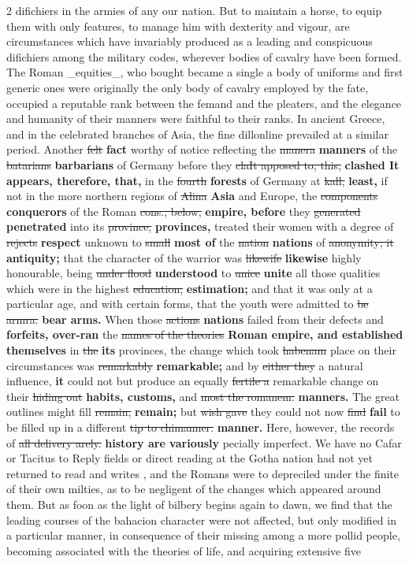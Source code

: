 \documentclass[10pt]{article}
\begin{document}
\begin{multicols}{2}
difichiers in the armies of any our nation. But to maintain a horse, to equip them with only features, to manage him with dexterity and vigour, are circumstances which have invariably produced as a leading and conspicuous difichiers among the military codes, wherever bodies of cavalry have been formed. The Roman \_equities\_, who bought became a single a body of uniforms and first generic ones were originally the only body of cavalry employed by the fate, occupied a reputable rank between the femand and the pleaters, and the elegance and humanity of their manners were faithful to their ranks. In ancient Greece, and in the celebrated branches of Asia, the fine dillonline prevailed at a similar period. Another \sout{felt} \textbf{fact} worthy of notice reflecting the \sout{manera} \textbf{manners} of the \sout{batarians} \textbf{barbarians} of Germany before they \sout{claIt apposed to, this,} \textbf{clashed It appears, therefore, that,} in the \sout{fourth} \textbf{forests} of Germany at \sout{kall,} \textbf{least,} if not in the more northern regions of \sout{Alina} \textbf{Asia} and Europe, the \sout{components} \textbf{conquerors} of the Roman \sout{cons., below,} \textbf{empire, before} they \sout{generated} \textbf{penetrated} into its \sout{province,} \textbf{provinces,} treated their women with a degree of \sout{rejects} \textbf{respect} unknown to \sout{small} \textbf{most of} the \sout{nation} \textbf{nations} of \sout{anonymity; it} \textbf{antiquity;} that the character of the warrior was \sout{likewife} \textbf{likewise} highly honourable, being \sout{under flood} \textbf{understood} to \sout{unice} \textbf{unite} all those qualities which were in the highest \sout{education,} \textbf{estimation;} and that it was only at a particular age, and with certain forms, that the youth were admitted to \sout{be armra.} \textbf{bear arms.} When those \sout{actions} \textbf{nations} failed from their defects and \textbf{forfeits, over-ran} the \sout{names of the theories} \textbf{Roman empire, and established themselves} in \sout{the} \textbf{its} provinces, the change which took \sout{habenam} place on their circumstances was \sout{remarkably} \textbf{remarkable;} and by \sout{either they} a natural influence, \textbf{it} could not but produce an equally \sout{fertile a} remarkable change on their \sout{hiding out} \textbf{habits, customs,} and \sout{most the romanem.} \textbf{manners.} The great outlines might fill \sout{remain,} \textbf{remain;} but \sout{wish gave} they could not now \sout{find} \textbf{fail} to be filled up in a different \sout{tip to chimanner.} \textbf{manner.} Here, however, the records of \sout{all delivery arely.} \textbf{history are variously} pecially imperfect. We have no Cafar or Tacitus to Reply fields or direct reading at the Gotha nation had not yet returned to read and writes , and the Romans were to depreciled under the finite of their own milties, as to be negligent of the changes which appeared around them. But as foon as the light of bilbery begins again to dawn, we find that the leading courses of the bahacion character were not affected, but only modified in a particular manner, in consequence of their missing among a more pollid people, becoming associated with the theories of life, and acquiring extensive five 
\end{multicols}
\end{document}
